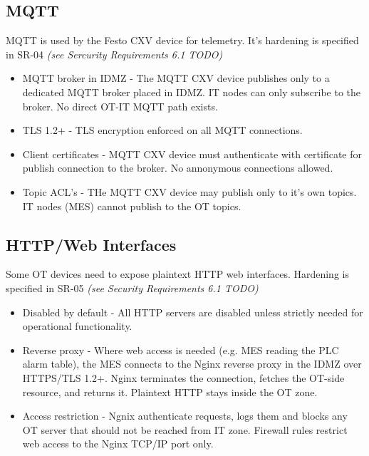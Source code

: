 \subsection{MQTT}
MQTT is used by the Festo CXV device for telemetry. It's hardening is specified in SR-04 \textit{(see Sercurity Requirements 6.1 TODO)}
\begin{itemize}
    \item MQTT broker in IDMZ - The MQTT CXV device publishes only to a dedicated MQTT broker placed in IDMZ. IT nodes 
        can only subscribe to the broker. No direct OT-IT MQTT path exists.
    \item TLS 1.2+ - TLS encryption enforced on all MQTT connections.
    \item Client certificates - MQTT CXV device must authenticate with certificate for publish connection to the broker. No annonymous connections allowed.
    \item Topic ACL's - THe MQTT CXV device may publish only to it's own topics. IT nodes (MES) cannot publish to the OT topics.
\end{itemize}

\subsection{HTTP/Web Interfaces}
Some OT devices need to expose plaintext HTTP web interfaces. Hardening is specified in SR-05 \textit{(see Security Requirements 6.1 TODO)}

\begin{itemize}
    \item Disabled by default - All HTTP servers are disabled unless strictly needed for operational functionality.
    \item Reverse proxy - Where web access is needed (e.g. MES reading the PLC alarm table), the MES connects to the Nginx reverse proxy in the IDMZ over HTTPS/TLS 1.2+. Nginx terminates the connection, fetches the OT-side resource, and returns it. Plaintext HTTP stays inside the OT zone.
    \item Access restriction - Ngnix authenticate requests, logs them and blocks any OT server that should not be reached from IT zone.
        Firewall rules restrict web access to the Nginx TCP/IP port only.
\end{itemize}

